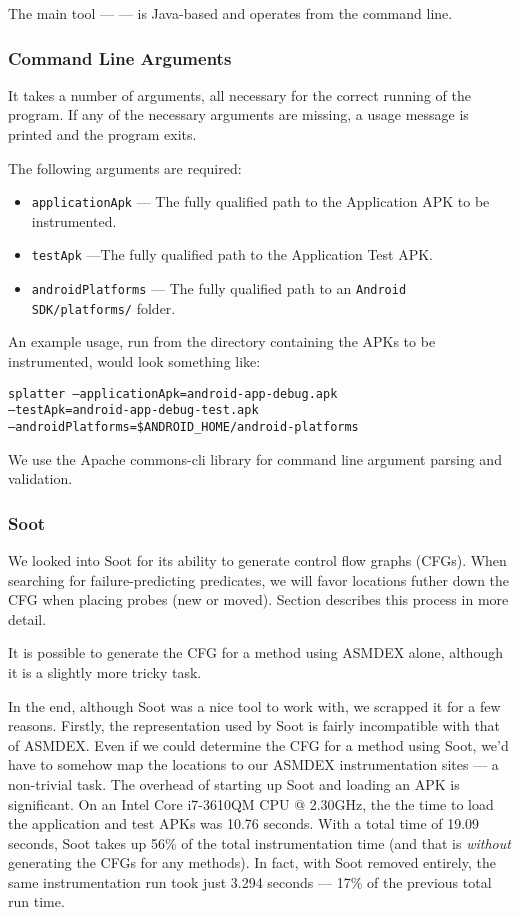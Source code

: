 The main tool --- \splatterinst{} --- is Java-based and operates from the command line.

\subsubsection{Command Line Arguments}

It takes a number of arguments, all necessary for the correct running of the program. If any of the necessary arguments are missing, a usage message is printed and the program exits.

The following arguments are required:
\begin{itemize}
    \item \texttt{applicationApk} --- The fully qualified path to the Application APK to be instrumented.
    \item \texttt{testApk} ---The fully qualified path to the Application Test APK.
    \item \texttt{androidPlatforms} --- The fully qualified path to an \texttt{Android SDK/platforms/} folder.
\end{itemize}

An example usage, run from the directory containing the APKs to be instrumented, would look something like:

\texttt{splatter --applicationApk=android-app-debug.apk\\--testApk=android-app-debug-test.apk\\--androidPlatforms=\$ANDROID\_HOME/android-platforms}

We use the Apache commons-cli library for command line argument parsing and validation.

\subsubsection{Soot}

We looked into Soot for its ability to generate control flow graphs (CFGs). When searching for failure-predicting predicates, we will favor locations futher down the CFG when placing probes (new or moved). Section  describes this process in more detail.

It is possible to generate the CFG for a method using ASMDEX alone, although it is a slightly more tricky task.

In the end, although Soot was a nice tool to work with, we scrapped it for a few reasons. Firstly, the representation used by Soot is fairly incompatible with that of ASMDEX. Even if we could determine the CFG for a method using Soot, we'd have to somehow map the locations to our ASMDEX instrumentation sites --- a non-trivial task. The overhead of starting up Soot and loading an APK is significant. On an Intel\textsuperscript{\textregistered} Core\textsuperscript{\texttrademark} i7-3610QM CPU @ 2.30GHz, the the time to load the application and test APKs was 10.76 seconds. With a total time of 19.09 seconds, Soot takes up 56\% of the total instrumentation time (and that is \textit{without} generating the CFGs for any methods). In fact, with Soot removed entirely, the same instrumentation run took just 3.294 seconds --- 17\% of the previous total run time.

